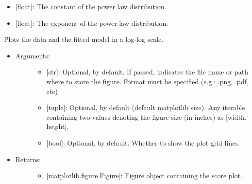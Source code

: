 \documentclass[letterpaper,10pt,english]{sphinxmanual}
\begin{document}
\begin{fulllineitems}
\begin{itemize}
\begin{description}
\begin{itemize}
\item {} 
 {[}float{]}: The constant of the power law distribution.

\item {} 
 {[}float{]}: The exponent of the power law distribution.

\end{itemize}

\end{description}

\end{itemize}

\begin{fulllineitems}
\label{\detokenize{models:data_tools.models.PowerLaw.plot}}
Plots the data and the fitted model in a log-log scale.
\begin{itemize}
\item {} \begin{description}
\item[{Arguments:}] \leavevmode\begin{itemize}
\item {} 
 {[}str{]}: Optional,  by default. If
passed, indicates the file name or path where to store the
figure. Format must be specified (e.g.: .png, .pdf, etc)

\item {} 
 {[}tuple{]}: Optional,  by default (default
matplotlib size). Any iterable containing two values
denoting the figure size (in inches) as {[}width, height{]}.

\item {} 
 {[}bool{]}: Optional,  by default. Whether to
show the plot grid lines.

\end{itemize}

\end{description}

\item {} \begin{description}
\item[{Returns:}] \leavevmode\begin{itemize}
\item {} 
{[}matplotlib.figure.Figure{]}: Figure object containing the
score plot.

\end{itemize}

\end{description}

\end{itemize}

\end{fulllineitems}


\end{fulllineitems}
\end{document}
